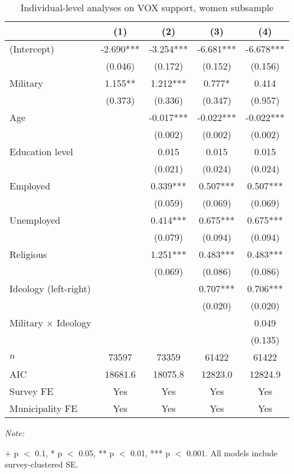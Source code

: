 \begin{table}[!h]

\caption{Individual-level analyses on VOX support, women subsample\label{tab:survey_glm_full_women}}
\centering
\begin{threeparttable}
\begin{tabular}[t]{lcccc}
\toprule
  & (1) & (2) & (3) & (4)\\
\midrule
(Intercept) & -2.690*** & -3.254*** & -6.681*** & -6.678***\\
 & (0.046) & (0.172) & (0.152) & (0.156)\\
Military & 1.155** & 1.212*** & 0.777* & 0.414\\
 & (0.373) & (0.336) & (0.347) & (0.957)\\
Age &  & -0.017*** & -0.022*** & -0.022***\\
 &  & (0.002) & (0.002) & (0.002)\\
Education level &  & 0.015 & 0.015 & 0.015\\
 &  & (0.021) & (0.024) & (0.024)\\
Employed &  & 0.339*** & 0.507*** & 0.507***\\
 &  & (0.059) & (0.069) & (0.069)\\
Unemployed &  & 0.414*** & 0.675*** & 0.675***\\
 &  & (0.079) & (0.094) & (0.094)\\
Religious &  & 1.251*** & 0.483*** & 0.483***\\
 &  & (0.069) & (0.086) & (0.086)\\
Ideology (left-right) &  &  & 0.707*** & 0.706***\\
 &  &  & (0.020) & (0.020)\\
Military $\times$ Ideology &  &  &  & 0.049\\
 &  &  &  & (0.135)\\
\midrule
$n$ & 73597 & 73359 & 61422 & 61422\\
AIC & 18681.6 & 18075.8 & 12823.0 & 12824.9\\
Survey FE & Yes & Yes & Yes & Yes\\
Municipality FE & Yes & Yes & Yes & Yes\\
\bottomrule
\end{tabular}
\begin{tablenotes}[para]
\item \textit{Note: } 
\item + p $<$ 0.1, * p $<$ 0.05, ** p $<$ 0.01, *** p $<$ 0.001. All models include survey-clustered SE.
\end{tablenotes}
\end{threeparttable}
\end{table}
